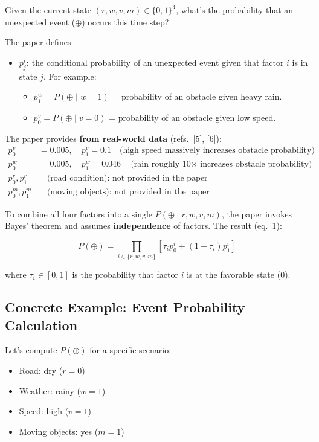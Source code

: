 \documentclass[12pt,a4paper]{article}
\begin{document}
Given the current state $(r, w, v, m) \in \{0,1\}^4$, what's the probability that an unexpected event ($\oplus$) occurs this time step?

The paper defines:
\begin{itemize}
    \item \textbf{$p^i_j$:} the conditional probability of an unexpected event given that factor $i$ is in state $j$. For example:
    \begin{itemize}
        \item $p^w_1 = P(\oplus \mid w=1)$ = probability of an obstacle given heavy rain.
        \item $p^v_0 = P(\oplus \mid v=0)$ = probability of an obstacle given low speed.
    \end{itemize}
\end{itemize}

The paper provides \textbf{from real-world data} (refs.~[5], [6]):
\begin{align*}
    p^v_0 &= 0.005, \quad p^v_1 = 0.1 \quad \text{(high speed massively increases obstacle probability)} \\
    p^w_0 &= 0.005, \quad p^w_1 = 0.046 \quad \text{(rain roughly 10$\times$ increases obstacle probability)} \\
    p^r_0, p^r_1 &\quad \text{(road condition): not provided in the paper} \\
    p^m_0, p^m_1 &\quad \text{(moving objects): not provided in the paper}
\end{align*}

To combine all four factors into a single $P(\oplus \mid r,w,v,m)$, the paper invokes Bayes' theorem and assumes \textbf{independence} of factors. The result (eq.~1):

\begin{equation}
P(\oplus) = \prod_{i \in \{r,w,v,m\}} \left[ \tau_i p^i_0 + (1-\tau_i) p^i_1 \right]
\end{equation}

\noindent where $\tau_i \in [0,1]$ is the probability that factor $i$ is at the favorable state (0).

\subsection{Concrete Example: Event Probability Calculation}

Let's compute $P(\oplus)$ for a specific scenario:
\begin{itemize}
    \item Road: dry ($r = 0$)
    \item Weather: rainy ($w = 1$)
    \item Speed: high ($v = 1$)
    \item Moving objects: yes ($m = 1$)
\end{itemize}
\end{document}
